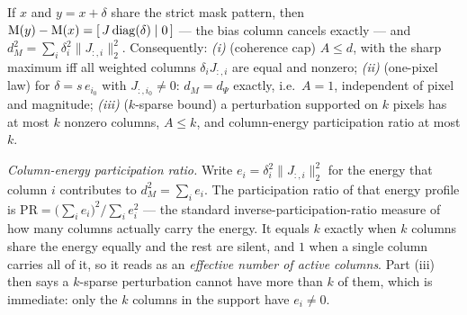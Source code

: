 \begin{theorem}\label{thm:within}
If $x$ and $y=x+\delta$ share the strict mask pattern, then
$\mathrm{M}(y)-\mathrm{M}(x)=[\,J\,\mathrm{diag}(\delta)\mid 0\,]$ --- the bias column cancels
exactly --- and $d_M^2=\sum_i\delta_i^2\|J_{:,i}\|_2^2$. Consequently:
\emph{(i)} (coherence cap) $A\le d$, with the sharp maximum iff all weighted
columns $\delta_iJ_{:,i}$ are equal and nonzero; \emph{(ii)} (one-pixel law)
for $\delta=s\,e_{i_0}$ with $J_{:,i_0}\neq0$: $d_M=d_\Psi$ exactly, i.e.\
$A=1$, independent of pixel and magnitude; \emph{(iii)} ($k$-sparse bound) a
perturbation supported on $k$ pixels has at most $k$ nonzero columns,
$A\le k$, and column-energy participation ratio at most $k$.
\end{theorem}

\begin{clarifybox}
\emph{Column-energy participation ratio.} Write $e_i=\delta_i^2\|J_{:,i}\|_2^2$
for the energy that column $i$ contributes to $d_M^2=\sum_ie_i$. The
participation ratio of that energy profile is
$\mathrm{PR}=\bigl(\sum_ie_i\bigr)^2\big/\sum_ie_i^2$ --- the standard
inverse-participation-ratio measure of how many columns actually carry the
energy. It equals $k$ exactly when $k$ columns share the energy equally and
the rest are silent, and $1$ when a single column carries all of it, so it
reads as an \emph{effective number of active columns}. Part (iii) then says a
$k$-sparse perturbation cannot have more than $k$ of them, which is immediate:
only the $k$ columns in the support have $e_i\neq0$.
\end{clarifybox}

